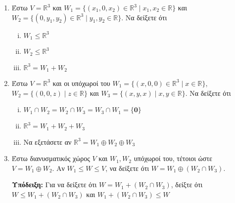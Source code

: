 


\thispagestyle{empty}



\begin{center}
\end{center}

\vspace{\baselineskip}

\begin{enumerate}
    \item Έστω $ V = \mathbb{R}^{3} $ και $ W_{1} = \{(x_{1},0,x_{2})\in 
        \mathbb{R}^{3} \mid x_{1}, x_{2} \in \mathbb{R}\}  $ και 
        $ W_{2} = \{(0,y_{1},y_{2}) \in \mathbb{R}^{3} \mid y_{1}, y_{2} \in
        \mathbb{R}  \}  $. Να δείξετε ότι 
        \begin{enumerate}[i)]
            \item $ W_{1} \leq \mathbb{R}^{3} $
            \item $ W_{2} \leq \mathbb{R}^{3} $
            \item $ \mathbb{R}^{3} = W_{1}+W_{2} $
        \end{enumerate}

    \item Έστω $ V = \mathbb{R}^{3} $ και οι υπόχωροί του $ W_{1} = 
        \{ (x,0,0) \in \mathbb{R}^{3} \mid x \in \mathbb{R}\} $, $ W_{2} = 
        \{ (0,0,z) \mid z \in \mathbb{R} \} $ και 
        $ W_{3} = \{ (x,y,x) \mid x,y \in \mathbb{R} \} $. Να δείξετε ότι 
        \begin{enumerate}[i)]
            \item $ W_{1} \cap W_{2} = W_{2} \cap W_{3} = W_{3} \cap W_{1} = 
                \{ \mathbf{0} \} $
            \item $ \mathbb{R}^{3} = W_{1}+W_{2}+W_{3} $
            \item Να εξετάσετε αν $ \mathbb{R}^{3} = W_{1} \oplus W_{2} \oplus W_{3} $
        \end{enumerate}

    \item Έστω διανυσματικός χώρος $V$ και $ W_{1}, W_{2} $ υπόχωροί του, τέτοιοι ώστε 
        $ V = W_{1} \oplus W_{2} $. Αν $ W_{1} \leq W \leq V $, να δείξετε ότι 
        $ W = W_{1} \oplus (W_{2} \cap W_{3}) $.

        \hfill \textbf{Υπόδειξη:} Για να δείξετε ότι $ W = W_{1} + (W_{2}\cap W_{3}) $, 
        δείξτε ότι $ W \leq W_{1} + (W_{2} \cap W_{3}) $ και 
        $ W_{1} + (W_{2} \cap W_{3}) \leq W $
\end{enumerate}




